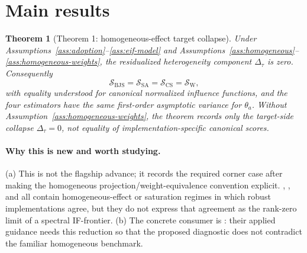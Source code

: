 \documentclass[11pt]{article}
\theoremstyle{definition}
\theoremstyle{plain}
\newtheorem{theorem}{Theorem}
\theoremstyle{remark}
\begin{document}
\section{Main results}
\begin{theorem}[Theorem 1: homogeneous-effect target collapse]\label{thm:homogeneous-collapse}
Under Assumptions~\ref{ass:adoption}--\ref{ass:eif-model} and
Assumptions~\ref{ass:homogeneous}--\ref{ass:homogeneous-weights}, the
residualized heterogeneity component
\(\Delta_\tau\) is zero.  Consequently
\[
\mathcal S_{\mathrm{BJS}}=\mathcal S_{\mathrm{SA}}=\mathcal S_{\mathrm{CS}}=\mathcal S_{\mathrm{W}},
\]
with equality understood for canonical normalized influence functions, and the
four estimators have the same first-order asymptotic variance for \(\theta_a\).
Without Assumption~\ref{ass:homogeneous-weights}, the theorem records only the
target-side collapse \(\Delta_\tau=0\), not equality of implementation-specific
canonical scores.
\end{theorem}

\paragraph{Why this is new and worth studying.}
(a) This is not the flagship advance; it records the required corner case after
making the homogeneous projection/weight-equivalence convention explicit.
\citet{SunAbraham2021}, \citet{CallawaySantAnna2021}, and \citet{Wooldridge2021}
all contain homogeneous-effect or saturation regimes in which robust
implementations agree, but they do not express that agreement as the rank-zero
limit of a spectral IF-frontier.  (b) The concrete consumer is
\citet{RothSantAnnaBilinskiPoe2023}: their applied guidance needs this reduction
so that the proposed diagnostic does not contradict the familiar homogeneous
benchmark.
\end{document}
